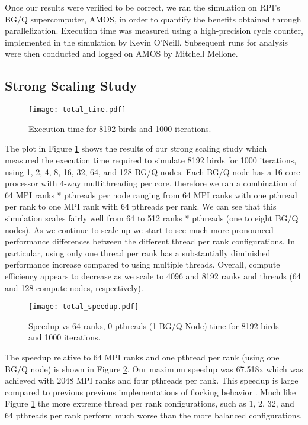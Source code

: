 Once our results were verified to be correct, we ran the simulation on
RPI's BG/Q supercomputer, AMOS, in order to quantify the benefits
obtained through parallelization. Execution time was measured using a
high-precision cycle counter, implemented in the simulation by Kevin
O'Neill. Subsequent runs for analysis were then conducted and logged
on AMOS by Mitchell Mellone.

\subsection*{Strong Scaling Study}
\begin{figure}[h!]
  \centering
  \texttt{[image: total\_time.pdf]}
  \caption{Execution time for 8192 birds and 1000 iterations.\label{fig:total}}
\end{figure}

The plot in Figure \ref{fig:total} shows the results of our strong
scaling study which measured the execution time required to simulate
8192 birds for 1000 iterations, using 1, 2, 4, 8, 16, 32, 64, and 128
BG/Q nodes. Each BG/Q node has a 16 core processor with 4-way
multithreading per core, therefore we ran a combination of 64 MPI
ranks * pthreads per node ranging from 64 MPI ranks with one pthread
per rank to one MPI rank with 64 pthreads per rank. We can see that
this simulation scales fairly well from 64 to 512 ranks * pthreads
(one to eight BG/Q nodes). As we continue to scale up we start to see
much more pronounced performance differences between the different
thread per rank configurations. In particular, using only one thread
per rank has a substantially diminished performance increase compared
to using multiple threads. Overall, compute efficiency appears to
decrease as we scale to 4096 and 8192 ranks and threads (64 and 128
compute nodes, respectively).

\begin{figure}[h!]
  \centering
  \texttt{[image: total\_speedup.pdf]}
  \caption{Speedup vs 64 ranks, 0 pthreads (1 BG/Q Node) time for 8192
    birds and 1000 iterations.\label{fig:totalspeedup}}
\end{figure}

The speedup relative to 64 MPI ranks and one pthread per rank (using
one BG/Q node) is shown in Figure \ref{fig:totalspeedup}. Our maximum
speedup was 67.518x which was achieved with 2048 MPI ranks and four
pthreads per rank. This speedup is large compared to previous previous
implementations of flocking behavior \cite{Lorek}. Much like Figure
\ref{fig:total} the more extreme thread per rank configurations, such
as 1, 2, 32, and 64 pthreads per rank perform much worse than the more
balanced configurations.

